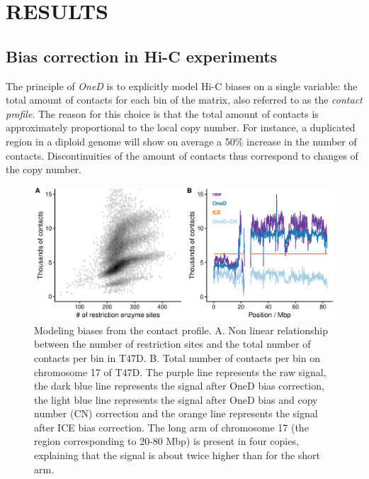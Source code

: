\documentclass[a4,center,fleqn]{NAR}
\providecommand{\DIFadd}[1]{{\protect\color{red}#1}} %
\providecommand{\DIFdel}[1]{{\protect}}                      %
\providecommand{\DIFaddbegin}{} %
\providecommand{\DIFaddend}{} %
\providecommand{\DIFdelbegin}{} %
\providecommand{\DIFdelend}{} %
\providecommand{\DIFaddFL}[1]{\DIFadd{#1}} %
\providecommand{\DIFdelFL}[1]{\DIFdel{#1}} %
\providecommand{\DIFaddbeginFL}{} %
\providecommand{\DIFaddendFL}{} %
\providecommand{\DIFdelbeginFL}{} %
\providecommand{\DIFdelendFL}{} %
\begin{document}
\section{RESULTS}

\subsection{\DIFdelbegin \DIFdel{Experimental bias }\DIFdelend \DIFaddbegin \DIFadd{Bias }\DIFaddend correction \DIFaddbegin \DIFadd{in Hi-C experiments}\DIFaddend }

The principle of \textit{OneD} is to explicitly model Hi-C biases on a
single variable: the total amount of contacts for each bin of the matrix\DIFdelbegin \DIFdel{(see \ref{sec:model} for detail)}\DIFdelend \DIFaddbegin \DIFadd{,
also referred to as the }\textit{\DIFadd{contact profile}}\DIFaddend . The reason for this
choice is that the total amount of contacts is approximately proportional
to the local copy number. For instance, a duplicated region in a diploid
genome will show on average a 50\% increase in the number of contacts.
Discontinuities of the amount of contacts thus correspond to changes of
the copy number.

\begin{figure}
\DIFdelbeginFL %
\DIFdelendFL \DIFaddbeginFL \centerline{\includegraphics[width=.49\textwidth]
  {nar_figures/figure_1.eps}}
\DIFaddendFL \caption{\DIFdelbeginFL \DIFdelFL{Total amount of contacts per bin}\DIFdelendFL \DIFaddbeginFL \DIFaddFL{Modeling biases from the contact profile}\DIFaddendFL . A. Non linear
relationship between the number of restriction sites and the total number
of contacts per bin in T47D. B. Total number of contacts per bin on
chromosome 17 of T47D. The \DIFdelbeginFL \DIFdelFL{brown }\DIFdelendFL \DIFaddbeginFL \DIFaddFL{purple }\DIFaddendFL line represents the raw signal, the \DIFaddbeginFL \DIFaddFL{dark }\DIFaddendFL blue
line represents the signal after \DIFaddbeginFL \DIFaddFL{OneD }\DIFaddendFL bias correction, the \DIFdelbeginFL \DIFdelFL{black }\DIFdelendFL \DIFaddbeginFL \DIFaddFL{light blue }\DIFaddendFL line
represents the signal after \DIFaddbeginFL \DIFaddFL{OneD }\DIFaddendFL bias and copy number (CN) correction \DIFaddbeginFL \DIFaddFL{and
the orange line represents the signal after ICE bias correction}\DIFaddendFL . The long arm
of chromosome 17 (the region corresponding to 20-80 Mbp) is present in
four copies, explaining that the signal is about twice higher than for
the short arm.}
\label{fig:totals}
\end{figure}
\end{document}
